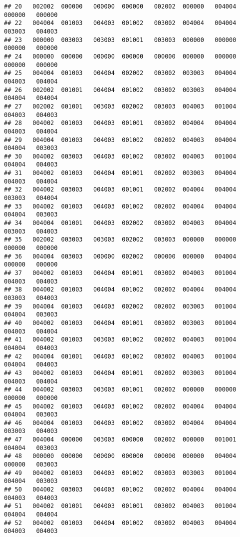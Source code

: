 \documentclass[
]{article}
\begin{document}
\begin{verbatim}
## 20   002002  000000   000000  000000   002002  000000   004004  000000   000000
## 22   004004  001003   004003  001002   003002  004004   004004  003003   004003
## 23   000000  003003   003003  001001   003003  000000   000000  000000   000000
## 24   000000  000000   000000  000000   000000  000000   000000  000000   000000
## 25   004004  001003   004004  002002   003002  003003   004004  004003   004004
## 26   002002  001001   004004  001002   003002  003003   004004  004004   004004
## 27   002002  001001   003003  002002   003003  004003   001004  004003   004003
## 28   004002  001003   004003  001001   003002  004004   004004  004003   004004
## 29   004004  001003   004003  001002   002002  004003   004004  004004   003003
## 30   004002  003003   004003  001002   003002  004003   001004  004004   004003
## 31   004002  001003   004004  001001   002002  003003   004004  004003   004004
## 32   004002  003003   004003  001001   002002  004004   004004  003003   004004
## 33   004002  001003   004003  001002   002002  004004   004004  004004   003003
## 34   004004  001001   004003  002002   003002  004003   004004  003003   004003
## 35   002002  003003   003003  002002   003003  000000   000000  000000   000000
## 36   004004  003003   000000  002002   000000  000000   004004  000000   000000
## 37   004002  001003   004004  001001   003002  004003   001004  004003   004003
## 38   004002  001003   004004  001002   002002  004004   004004  003003   004003
## 39   004004  001003   004003  002002   002002  003003   001004  004004   003003
## 40   004002  001003   004004  001001   003002  003003   001004  004003   004004
## 41   004002  001003   003003  001002   002002  004003   001004  004004   004003
## 42   004004  001001   004003  001002   003002  004003   001004  004004   004003
## 43   004002  001003   004004  001001   002002  003003   001004  004003   004004
## 44   004002  003003   003003  001001   002002  000000   000000  000000   000000
## 45   004002  001003   004003  001002   002002  004004   004004  004004   003003
## 46   004004  001003   004003  001002   003002  004004   004004  003003   004003
## 47   004004  000000   003003  000000   002002  000000   001001  004004   003003
## 48   000000  000000   000000  000000   000000  000000   004004  000000   003003
## 49   004002  001003   004003  001002   003003  003003   001004  004004   003003
## 50   004002  003003   004003  001002   002002  004004   004004  004003   004003
## 51   004002  001001   004003  001001   003002  004003   001004  004004   004004
## 52   004002  001003   004004  001002   003002  004003   004004  004003   004003

\end{verbatim}
\end{document}
